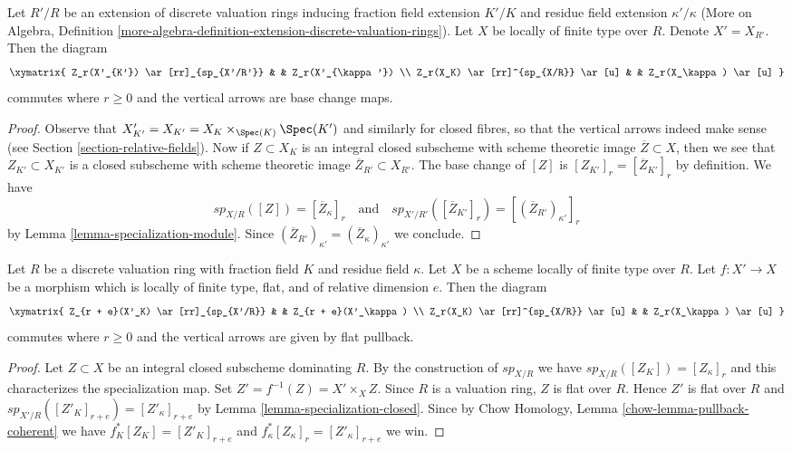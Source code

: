 \begin{lemma}
\label{lemma-specialization-extension}
Let $R'/R$ be an extension of discrete valuation rings inducing fraction field
extension $K'/K$ and residue field extension $\kappa'/\kappa$
(More on Algebra, Definition
\ref{more-algebra-definition-extension-discrete-valuation-rings}).
Let $X$ be locally of finite type over $R$. Denote $X' = X_{R'}$.
Then the diagram
$$
\xymatrix{
Z_r(X'_{K'}) \ar[rr]_{sp_{X'/R'}} & & Z_r(X'_{\kappa'}) \\
Z_r(X_K) \ar[rr]^{sp_{X/R}} \ar[u] & & Z_r(X_\kappa) \ar[u]
}
$$
commutes where $r \geq 0$ and the vertical arrows are base change maps.
\end{lemma}

\begin{proof}
Observe that $X'_{K'} = X_{K'} = X_K \times_{\Spec(K)} \Spec(K')$
and similarly for closed fibres, so that the vertical arrows indeed
make sense (see Section \ref{section-relative-fields}).
Now if $Z \subset X_K$ is an integral closed subscheme with
scheme theoretic image $\overline{Z} \subset X$, then we see that
$Z_{K'} \subset X_{K'}$ is a closed subscheme with scheme theoretic
image $\overline{Z}_{R'} \subset X_{R'}$. The base change of
$[Z]$ is $[Z_{K'}]_r = [\overline{Z}_{K'}]_r$ by definition. We have
$$
sp_{X/R}([Z]) = [\overline{Z}_\kappa]_r
\quad\text{and}\quad
sp_{X'/R'}([\overline{Z}_{K'}]_r) = [(\overline{Z}_{R'})_{\kappa'}]_r
$$
by Lemma \ref{lemma-specialization-module}. Since
$(\overline{Z}_{R'})_{\kappa'} = (\overline{Z}_\kappa)_{\kappa'}$
we conclude.
\end{proof}

\begin{lemma}
\label{lemma-specialization-flat-pullback}
Let $R$ be a discrete valuation ring with fraction field $K$ and residue field
$\kappa$. Let $X$ be a scheme locally of finite type over $R$.
Let $f : X' \to X$ be a morphism which is locally of finite type, flat,
and of relative dimension $e$. Then the diagram
$$
\xymatrix{
Z_{r + e}(X'_K) \ar[rr]_{sp_{X'/R}} & & Z_{r + e}(X'_\kappa) \\
Z_r(X_K) \ar[rr]^{sp_{X/R}} \ar[u] & & Z_r(X_\kappa) \ar[u]
}
$$
commutes where $r \geq 0$ and the vertical arrows are given
by flat pullback.
\end{lemma}

\begin{proof}
Let $Z \subset X$ be an integral closed subscheme dominating $R$.
By the construction of $sp_{X/R}$ we have $sp_{X/R}([Z_K]) = [Z_\kappa]_r$
and this characterizes the specialization map.
Set $Z' = f^{-1}(Z) = X' \times_X Z$.
Since $R$ is a valuation ring, $Z$ is flat over $R$.
Hence $Z'$ is flat over $R$ and
$sp_{X'/R}([Z'_K]_{r + e}) = [Z'_\kappa]_{r + e}$
by Lemma \ref{lemma-specialization-closed}.
Since by Chow Homology, Lemma \ref{chow-lemma-pullback-coherent}
we have $f_K^*[Z_K] = [Z'_K]_{r + e}$ and
$f_\kappa^*[Z_\kappa]_r = [Z'_\kappa]_{r + e}$ we win.
\end{proof}

